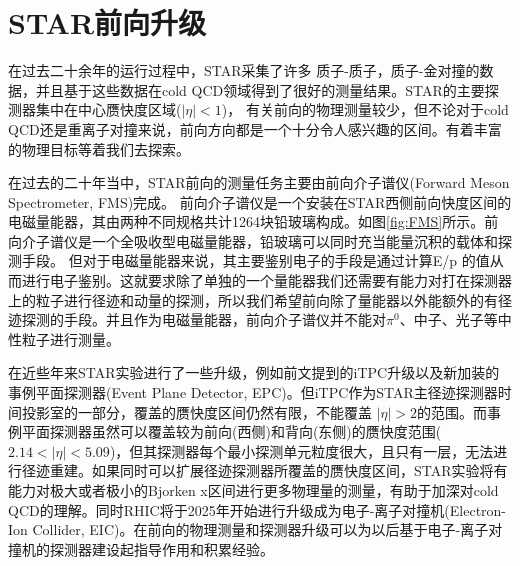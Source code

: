 \section{STAR前向升级}

在过去二十余年的运行过程中，STAR采集了许多 质子-质子，质子-金对撞的数据，并且基于这些数据在cold QCD领域得到了很好的测量结果。STAR的主要探测器集中在中心赝快度区域($|\eta| < 1$)，
有关前向的物理测量较少，但不论对于cold QCD还是重离子对撞来说，前向方向都是一个十分令人感兴趣的区间。有着丰富的物理目标等着我们去探索。

在过去的二十年当中，STAR前向的测量任务主要由前向介子谱仪(Forward Meson Spectrometer, FMS)完成。
前向介子谱仪是一个安装在STAR西侧前向快度区间的电磁量能器，其由两种不同规格共计1264块铅玻璃构成。如图\ref{fig:FMS}所示。前向介子谱仪是一个全吸收型电磁量能器，铅玻璃可以同时充当能量沉积的载体和探测手段。
但对于电磁量能器来说，其主要鉴别电子的手段是通过计算E/p 的值从而进行电子鉴别。这就要求除了单独的一个量能器我们还需要有能力对打在探测器上的粒子进行径迹和动量的探测，所以我们希望前向除了量能器以外能额外的有径迹探测的手段。并且作为电磁量能器，前向介子谱仪并不能对$\pi^0$、中子、光子等中性粒子进行测量。

在近些年来STAR实验进行了一些升级，例如前文提到的iTPC升级以及新加装的事例平面探测器(Event Plane Detector, EPC)。但iTPC作为STAR主径迹探测器时间投影室的一部分，覆盖的赝快度区间仍然有限，不能覆盖 $|\eta| > 2$的范围。而事例平面探测器虽然可以覆盖较为前向(西侧)和背向(东侧)的赝快度范围($2.14 < |\eta| < 5.09 $)，但其探测器每个最小探测单元粒度很大，且只有一层，无法进行径迹重建。如果同时可以扩展径迹探测器所覆盖的赝快度区间，STAR实验将有能力对极大或者极小的Bjorken x区间进行更多物理量的测量，有助于加深对cold QCD的理解。同时RHIC将于2025年开始进行升级成为电子-离子对撞机(Electron-Ion Collider, EIC)。在前向的物理测量和探测器升级可以为以后基于电子-离子对撞机的探测器建设起指导作用和积累经验。

